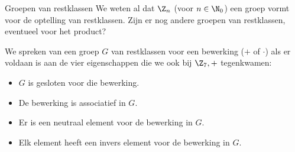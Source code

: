 	\begin{lesactiviteit}{Groepen van restklassen}
		We weten al dat $\Z_n$ (voor $n \in \N_0$) een groep vormt voor de optelling van restklassen. Zijn er nog andere groepen van restklassen, eventueel voor het product? 
		
		We spreken van een groep $G$ van restklassen voor een bewerking ($+$ of $\cdot$) als er voldaan is aan de vier eigenschappen die we ook bij $\Z_7,+$ tegenkwamen:
		\begin{center}
			\begin{itemize}
			\item $G$ is gesloten voor die bewerking.
			\item De bewerking is associatief in $G$.
			\item Er is een neutraal element voor de bewerking in $G$.
			\item Elk element heeft een invers element voor de bewerking in $G$. 
		\end{itemize}
		\end{center}
		 
		
		\begin{vraagenantwoord}
			
			
			

\end{vraagenantwoord}
\end{lesactiviteit}
